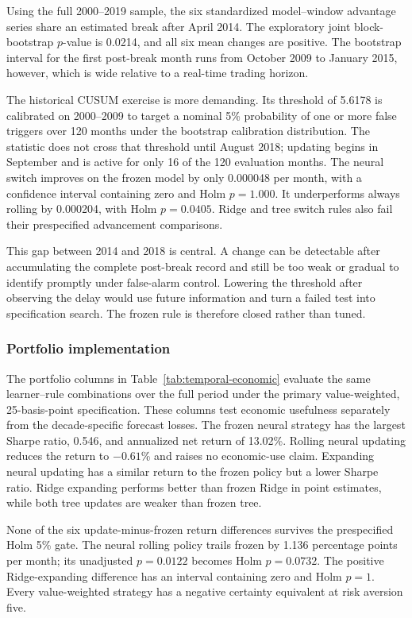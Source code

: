 Using the full 2000--2019 sample, the six standardized model--window advantage series share an estimated break after April 2014. The exploratory joint block-bootstrap $p$-value is 0.0214, and all six mean changes are positive. The bootstrap interval for the first post-break month runs from October 2009 to January 2015, however, which is wide relative to a real-time trading horizon.

The historical CUSUM exercise is more demanding. Its threshold of 5.6178 is calibrated on 2000--2009 to target a nominal 5\% probability of one or more false triggers over 120 months under the bootstrap calibration distribution. The statistic does not cross that threshold until August 2018; updating begins in September and is active for only 16 of the 120 evaluation months. The neural switch improves on the frozen model by only 0.000048 per month, with a confidence interval containing zero and Holm $p=1.000$. It underperforms always rolling by 0.000204, with Holm $p=0.0405$. Ridge and tree switch rules also fail their prespecified advancement comparisons.

This gap between 2014 and 2018 is central. A change can be detectable after accumulating the complete post-break record and still be too weak or gradual to identify promptly under false-alarm control. Lowering the threshold after observing the delay would use future information and turn a failed test into specification search. The frozen rule is therefore closed rather than tuned.

\subsubsection{Portfolio implementation}

The portfolio columns in Table~\ref{tab:temporal-economic} evaluate the same learner--rule combinations over the full period under the primary value-weighted, 25-basis-point specification. These columns test economic usefulness separately from the decade-specific forecast losses. The frozen neural strategy has the largest Sharpe ratio, 0.546, and annualized net return of 13.02\%. Rolling neural updating reduces the return to $-0.61$\% and raises no economic-use claim. Expanding neural updating has a similar return to the frozen policy but a lower Sharpe ratio. Ridge expanding performs better than frozen Ridge in point estimates, while both tree updates are weaker than frozen tree.

None of the six update-minus-frozen return differences survives the prespecified Holm 5\% gate. The neural rolling policy trails frozen by 1.136 percentage points per month; its unadjusted $p=0.0122$ becomes Holm $p=0.0732$. The positive Ridge-expanding difference has an interval containing zero and Holm $p=1$. Every value-weighted strategy has a negative certainty equivalent at risk aversion five.

